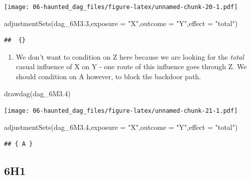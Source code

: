 \documentclass[
]{book}
\newenvironment{Shaded}{\begin{snugshade}}{\end{snugshade}}
\newcommand{\AttributeTok}[1]{\textcolor[rgb]{0.77,0.63,0.00}{#1}}
\newcommand{\FloatTok}[1]{\textcolor[rgb]{0.00,0.00,0.81}{#1}}
\newcommand{\FunctionTok}[1]{\textcolor[rgb]{0.00,0.00,0.00}{#1}}
\newcommand{\NormalTok}[1]{#1}
\newcommand{\StringTok}[1]{\textcolor[rgb]{0.31,0.60,0.02}{#1}}
\providecommand{\tightlist}{%
  \setlength{\itemsep}{0pt}\setlength{\parskip}{0pt}}
\begin{document}
\texttt{[image: 06-haunted\_dag\_files/figure-latex/unnamed-chunk-20-1.pdf]}

\begin{Shaded}
\begin{Highlighting}[]
\FunctionTok{adjustmentSets}\NormalTok{(dag\_6M3}\FloatTok{.3}\NormalTok{,}\AttributeTok{exposure =} \StringTok{"X"}\NormalTok{,}\AttributeTok{outcome =} \StringTok{"Y"}\NormalTok{,}\AttributeTok{effect =} \StringTok{"total"}\NormalTok{)}
\end{Highlighting}
\end{Shaded}

\begin{verbatim}
##  {}
\end{verbatim}

\begin{enumerate}
\def\labelenumi{\arabic{enumi}.}
\setcounter{enumi}{3}
\tightlist
\item
  We don't want to condition on Z here because we are looking for the \emph{total} casual influence of X on Y - one route of this influence goes through Z. We should condition on A however, to block the backdoor path.
\end{enumerate}

\begin{Shaded}
\begin{Highlighting}[]
\FunctionTok{drawdag}\NormalTok{(dag\_6M3}\FloatTok{.4}\NormalTok{)}
\end{Highlighting}
\end{Shaded}

\texttt{[image: 06-haunted\_dag\_files/figure-latex/unnamed-chunk-21-1.pdf]}

\begin{Shaded}
\begin{Highlighting}[]
\FunctionTok{adjustmentSets}\NormalTok{(dag\_6M3}\FloatTok{.4}\NormalTok{,}\AttributeTok{exposure =} \StringTok{"X"}\NormalTok{,}\AttributeTok{outcome =} \StringTok{"Y"}\NormalTok{,}\AttributeTok{effect =} \StringTok{"total"}\NormalTok{)}
\end{Highlighting}
\end{Shaded}

\begin{verbatim}
## { A }
\end{verbatim}

\hypertarget{h1-2}{%
\subsection*{6H1}\label{h1-2}}
\end{document}
